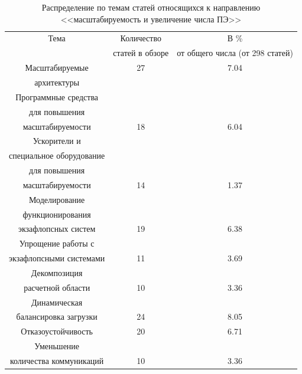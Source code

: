  \begin{table}[ht]
 	\caption{Распределение по темам статей относящихся к направлению
 		<<масштабируемость и увеличение числа ПЭ>>}
 	\begin{center}
 		\begin{tabular}{|c|c|c|}
 			\hline
 			Тема                       & Количество          & В \%           \\
 			& статей в обзоре     & от общего числа (от 298 статей)  \\ \hline 
 			Масштабируемые                 & 27 & 7.04  \\    
 			архитектуры                    &    &       \\   \hline
 			Программные средства           &    &       \\
 			для повышения                  &    &       \\
 			масштабируемости              & 18 & 6.04  \\ \hline 
 			Ускорители и                   &    &      \\
 			специальное оборудование       &    &      \\
 			для повышения                  &    &      \\
 			масштабируемости              & 14 &  1.37 \\ \hline 
 			Моделирование                  &    &     \\
 			функционирования               &    &     \\
 			экзафлопсных систем            & 19 & 6.38  \\ \hline 
 			Упрощение работы с             &    &          \\
 			экзафлопсными системами       & 11 & 3.69 \\ \hline 
 			Декомпозиция                   &    &	      \\
 			расчетной области             & 10 &  3.36 \\ \hline 
 			Динамическая                   &    &       \\
 			балансировка загрузки          & 24 &  8.05 \\ \hline 
 			Отказоустойчивость             & 20 & 6.71  \\ \hline 
 			Уменьшение                     &    &        \\
 			количества коммуникаций        & 10 & 3.36   \\ \hline 
 		\end{tabular}
 	\end{center}
 	\label{topic_maxPE}
 \end{table}
 
